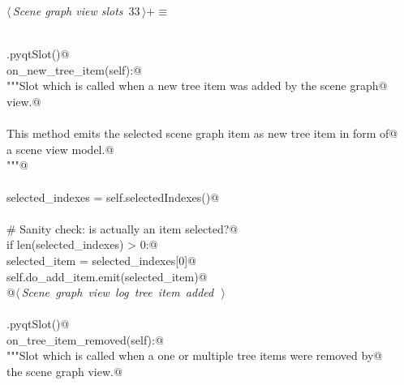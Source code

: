 \documentclass[
    a4paper,      %
    10pt,         %
    openright,    %
    notitlepage,  %
    parskip=half, %
]{scrreprt}       %
\theoremstyle{definition}                    %
\begin{document}
\begin{flushleft} \small
\begin{minipage}{\linewidth}\label{scrap36}\raggedright\small
{} $\langle\,${\itshape Scene graph view slots}\nobreak\ {\footnotesize {33}}$\,\rangle+\equiv$
\vspace{-1ex}
\begin{list}{}{} \item
\mbox{}\lstinline@@\\
\mbox{}\lstinline@QtCore.pyqtSlot()@\\
\mbox{}\lstinline@def on_new_tree_item(self):@\\
\mbox{}\lstinline@    """Slot which is called when a new tree item was added by the scene graph@\\
\mbox{}\lstinline@    view.@\\
\mbox{}\lstinline@@\\
\mbox{}\lstinline@    This method emits the selected scene graph item as new tree item in form of@\\
\mbox{}\lstinline@    a scene view model.@\\
\mbox{}\lstinline@    """@\\
\mbox{}\lstinline@@\\
\mbox{}\lstinline@    selected_indexes = self.selectedIndexes()@\\
\mbox{}\lstinline@@\\
\mbox{}\lstinline@    # Sanity check: is actually an item selected?@\\
\mbox{}\lstinline@    if len(selected_indexes) > 0:@\\
\mbox{}\lstinline@        selected_item = selected_indexes[0]@\\
\mbox{}\lstinline@        self.do_add_item.emit(selected_item)@\\
\mbox{}\lstinline@        @\hbox{$\langle\,${\itshape Scene graph view log tree item added}\nobreak\ {\footnotesize {}}$\,\rangle$}\lstinline@@\\
\mbox{}\lstinline@@\\
\mbox{}\lstinline@QtCore.pyqtSlot()@\\
\mbox{}\lstinline@def on_tree_item_removed(self):@\\
\mbox{}\lstinline@    """Slot which is called when a one or multiple tree items were removed by@\\
\mbox{}\lstinline@    the scene graph view.@\\
\mbox{}\lstinline@@\\

\end{list}
\end{minipage}
\end{flushleft}
\end{document}
